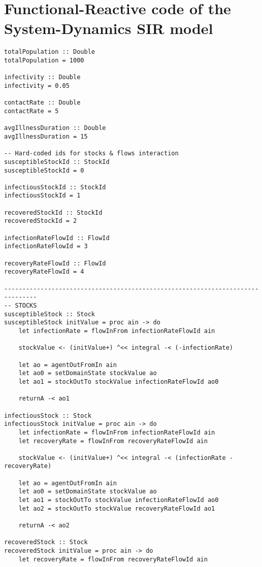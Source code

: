 \section{Functional-Reactive code of the System-Dynamics SIR model}

\begin{verbatim}
totalPopulation :: Double
totalPopulation = 1000

infectivity :: Double
infectivity = 0.05

contactRate :: Double
contactRate = 5

avgIllnessDuration :: Double
avgIllnessDuration = 15

-- Hard-coded ids for stocks & flows interaction
susceptibleStockId :: StockId
susceptibleStockId = 0

infectiousStockId :: StockId
infectiousStockId = 1

recoveredStockId :: StockId
recoveredStockId = 2

infectionRateFlowId :: FlowId
infectionRateFlowId = 3

recoveryRateFlowId :: FlowId
recoveryRateFlowId = 4

-------------------------------------------------------------------------------
-- STOCKS
susceptibleStock :: Stock
susceptibleStock initValue = proc ain -> do
    let infectionRate = flowInFrom infectionRateFlowId ain

    stockValue <- (initValue+) ^<< integral -< (-infectionRate)
    
    let ao = agentOutFromIn ain
    let ao0 = setDomainState stockValue ao
    let ao1 = stockOutTo stockValue infectionRateFlowId ao0

    returnA -< ao1

infectiousStock :: Stock
infectiousStock initValue = proc ain -> do
    let infectionRate = flowInFrom infectionRateFlowId ain
    let recoveryRate = flowInFrom recoveryRateFlowId ain

    stockValue <- (initValue+) ^<< integral -< (infectionRate - recoveryRate)
    
    let ao = agentOutFromIn ain
    let ao0 = setDomainState stockValue ao
    let ao1 = stockOutTo stockValue infectionRateFlowId ao0 
    let ao2 = stockOutTo stockValue recoveryRateFlowId ao1
    
    returnA -< ao2

recoveredStock :: Stock
recoveredStock initValue = proc ain -> do
    let recoveryRate = flowInFrom recoveryRateFlowId ain


\end{verbatim}
